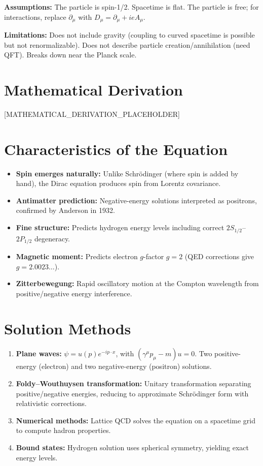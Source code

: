 \documentclass[11pt,openright]{book}
\begin{document}
\textbf{Assumptions:} The particle is spin-1/2. Spacetime is flat. The particle is free; for interactions, replace $\partial_\mu$ with $D_\mu = \partial_\mu + ieA_\mu$.


\textbf{Limitations:} Does not include gravity (coupling to curved spacetime is possible but not renormalizable). Does not describe particle creation/annihilation (need QFT). Breaks down near the Planck scale.


\section*{Mathematical Derivation}

[MATHEMATICAL_DERIVATION_PLACEHOLDER]

\section*{Characteristics of the Equation}

\begin{itemize}
\item \textbf{Spin emerges naturally:} Unlike Schr\"odinger (where spin is added by hand), the Dirac equation produces spin from Lorentz covariance.
\item \textbf{Antimatter prediction:} Negative-energy solutions interpreted as positrons, confirmed by Anderson in 1932.
\item \textbf{Fine structure:} Predicts hydrogen energy levels including correct $2S_{1/2}$--$2P_{1/2}$ degeneracy.
\item \textbf{Magnetic moment:} Predicts electron $g$-factor $g = 2$ (QED corrections give $g = 2.0023\ldots$).
\item \textbf{Zitterbewegung:} Rapid oscillatory motion at the Compton wavelength from positive/negative energy interference.
\end{itemize}
\section*{Solution Methods}

\begin{enumerate}
\item \textbf{Plane waves:} $\psi = u(p) e^{-ip \cdot x}$, with $(\gamma^\mu p_\mu - m) u = 0$. Two positive-energy (electron) and two negative-energy (positron) solutions.
\item \textbf{Foldy--Wouthuysen transformation:} Unitary transformation separating positive/negative energies, reducing to approximate Schr\"odinger form with relativistic corrections.
\item \textbf{Numerical methods:} Lattice QCD solves the equation on a spacetime grid to compute hadron properties.
\item \textbf{Bound states:} Hydrogen solution uses spherical symmetry, yielding exact energy levels.
\end{enumerate}
\end{document}
